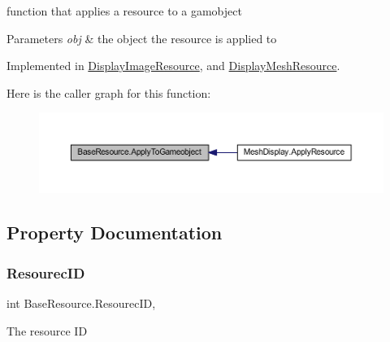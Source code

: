 function that applies a resource to a gamobject 


\begin{DoxyParams}{Parameters}
{\em obj} & the object the resource is applied to\\
\hline
\end{DoxyParams}


Implemented in \mbox{\hyperlink{class_display_image_resource_a26992a5ecb6c449d85539cc5d07112e2}{Display\+Image\+Resource}}, and \mbox{\hyperlink{class_display_mesh_resource_a62672f28a402bebeed1cb79fcca81828}{Display\+Mesh\+Resource}}.

Here is the caller graph for this function\+:
\nopagebreak
\begin{figure}[H]
\begin{center}
\leavevmode
\includegraphics[width=350pt]{class_base_resource_a2d832c8042114da9e3f6240651d59703_icgraph}
\end{center}
\end{figure}


\subsection{Property Documentation}
\mbox{\label{class_base_resource_adbdcd8935067e622c993b912a475c21b}} 
\subsubsection{\texorpdfstring{Resourec\+ID}{ResourecID}}
{\footnotesize\ttfamily int Base\+Resource.\+Resourec\+ID\hspace{0.3cm}{\ttfamily [get]}, {\ttfamily [set]}}



The resource ID 

\mbox{\label{class_base_resource_a6c40931e66a2e4fd8061f069eb0c0ba8}} 
